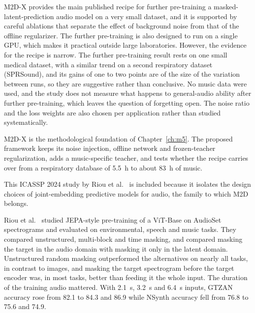 \documentclass{FastFyp}
\begin{document}
\lrcritical
M2D-X provides the main published recipe for further pre-training a masked-latent-prediction audio model on a very small dataset, and it is supported by careful ablations that separate the effect of background noise from that of the offline regularizer. The further pre-training is also designed to run on a single GPU, which makes it practical outside large laboratories. However, the evidence for the recipe is narrow. The further pre-training result rests on one small medical dataset, with a similar trend on a second respiratory dataset (SPRSound), and its gains of one to two points are of the size of the variation between runs, so they are suggestive rather than conclusive. No music data were used, and the study does not measure what happens to general-audio ability after further pre-training, which leaves the question of forgetting open. The noise ratio and the loss weights are also chosen per application rather than studied systematically.

\lrrelation
M2D-X is the methodological foundation of Chapter~\ref{ch:m5}. The proposed framework keeps its noise injection, offline network and frozen-teacher regularization, adds a music-specific teacher, and tests whether the recipe carries over from a respiratory database of 5.5~h to about 83~h of music.

This ICASSP 2024 study by Riou et al.~\cite{ref:Riou:2024jepa} is included because it isolates the design choices of joint-embedding predictive models for audio, the family to which M2D belongs.

\lrsummary
Riou et al.~\cite{ref:Riou:2024jepa} studied JEPA-style pre-training of a ViT-Base on AudioSet spectrograms and evaluated on environmental, speech and music tasks. They compared unstructured, multi-block and time masking, and compared masking the target in the audio domain with masking it only in the latent domain. Unstructured random masking outperformed the alternatives on nearly all tasks, in contrast to images, and masking the target spectrogram before the target encoder was, in most tasks, better than feeding it the whole input. The duration of the training audio mattered. With 2.1~s, 3.2~s and 6.4~s inputs, GTZAN accuracy rose from 82.1 to 84.3 and 86.9 while NSynth accuracy fell from 76.8 to 75.6 and 74.9.
\end{document}
